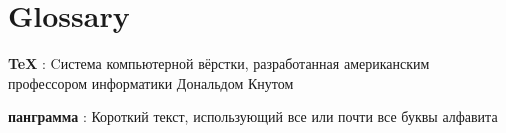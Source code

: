\chapter*{Glossary}             %

\textbf{TeX} : Cистема компьютерной вёрстки, разработанная американским профессором информатики Дональдом Кнутом

\textbf{панграмма} : Короткий текст, использующий все или почти все буквы алфавита
